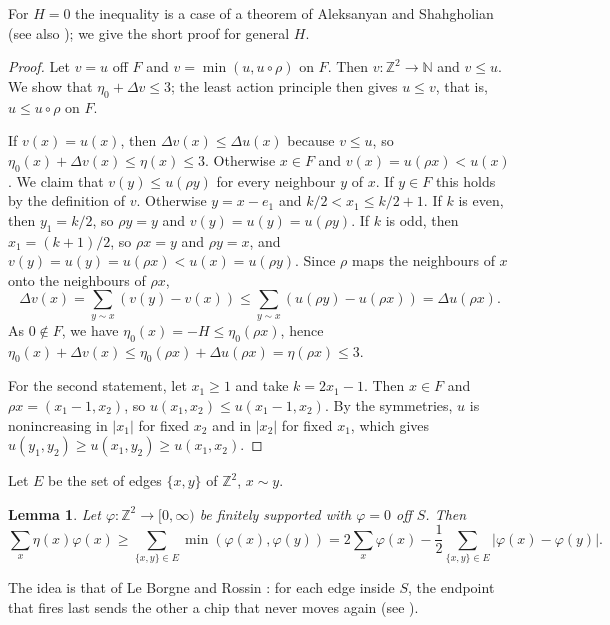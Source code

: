 \documentclass[11pt]{amsart}
\newtheorem{lemma}[theorem]{Lemma}
\theoremstyle{remark}
\numberwithin{equation}{section}
\newcommand{\Z}{\mathbb Z}
\newcommand{\N}{\mathbb N}
\begin{document}
For $H=0$ the inequality is a case of a theorem of Aleksanyan and Shahgholian \cite[Theorem~4.6]{AS} (see also \cite[Remark~4.8]{AS}); we give the short proof for general $H$.

\begin{proof}
Let $v=u$ off $F$ and $v=\min(u,u\circ\rho)$ on $F$. Then $v\colon\Z^2\to\N$ and $v\le u$. We show that $\eta_0+\Delta v\le3$; the least action principle then gives $u\le v$, that is, $u\le u\circ\rho$ on $F$.

If $v(x)=u(x)$, then $\Delta v(x)\le\Delta u(x)$ because $v\le u$, so $\eta_0(x)+\Delta v(x)\le\eta(x)\le3$. Otherwise $x\in F$ and $v(x)=u(\rho x)<u(x)$. We claim that $v(y)\le u(\rho y)$ for every neighbour $y$ of $x$. If $y\in F$ this holds by the definition of $v$. Otherwise $y=x-e_1$ and $k/2<x_1\le k/2+1$. If $k$ is even, then $y_1=k/2$, so $\rho y=y$ and $v(y)=u(y)=u(\rho y)$. If $k$ is odd, then $x_1=(k+1)/2$, so $\rho x=y$ and $\rho y=x$, and $v(y)=u(y)=u(\rho x)<u(x)=u(\rho y)$. Since $\rho$ maps the neighbours of $x$ onto the neighbours of $\rho x$,
\[
\Delta v(x)=\sum_{y\sim x}(v(y)-v(x))\le\sum_{y\sim x}(u(\rho y)-u(\rho x))=\Delta u(\rho x).
\]
As $0\notin F$, we have $\eta_0(x)=-H\le\eta_0(\rho x)$, hence $\eta_0(x)+\Delta v(x)\le\eta_0(\rho x)+\Delta u(\rho x)=\eta(\rho x)\le3$.

For the second statement, let $x_1\ge1$ and take $k=2x_1-1$. Then $x\in F$ and $\rho x=(x_1-1,x_2)$, so $u(x_1,x_2)\le u(x_1-1,x_2)$. By the symmetries, $u$ is nonincreasing in $|x_1|$ for fixed $x_2$ and in $|x_2|$ for fixed $x_1$, which gives $u(y_1,y_2)\ge u(x_1,y_2)\ge u(x_1,x_2)$.
\end{proof}

Let $E$ be the set of edges $\{x,y\}$ of $\Z^2$, $x\sim y$.

\begin{lemma}\label{lem:lastfiring}
Let $\varphi\colon\Z^2\to[0,\infty)$ be finitely supported with $\varphi=0$ off $S$. Then
\[
\sum_x\eta(x)\varphi(x)\ge\sum_{\{x,y\}\in E}\min(\varphi(x),\varphi(y))=2\sum_x\varphi(x)-\frac12\sum_{\{x,y\}\in E}|\varphi(x)-\varphi(y)|.
\]
\end{lemma}

The idea is that of Le Borgne and Rossin \cite{LBR}: for each edge inside $S$, the endpoint that fires last sends the other a chip that never moves again (see \cite[Section~4]{LP}).
\end{document}
